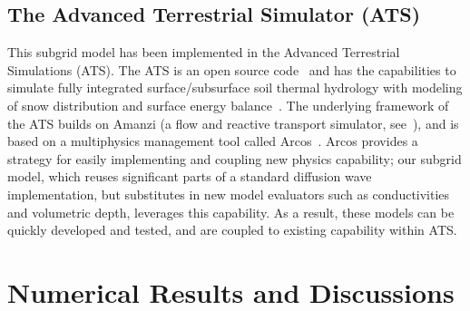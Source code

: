 \documentclass[review,11pt]{elsarticle}
\begin{document}
%
\subsection{The Advanced Terrestrial Simulator (ATS)}\label{ATS}
This subgrid model has been implemented in the Advanced Terrestrial Simulations (ATS).
The ATS is an open source code~\cite{ats-website} and has the capabilities to simulate fully integrated surface/subsurface soil thermal hydrology with modeling of snow distribution and surface energy balance~\cite{spainter2016integrated, atchley2015}.
The underlying framework of the ATS builds on Amanzi (a flow and reactive transport simulator, see~\cite{moulton2012high}), and is based on a multiphysics management tool called Arcos~\cite{ecoon2016managing}.
Arcos provides a strategy for easily implementing and coupling new physics capability; our subgrid model, which reuses significant parts of a standard diffusion wave implementation, but substitutes in new model evaluators such as conductivities and volumetric depth, leverages this capability.
As a result, these models can be quickly developed and tested, and are coupled to existing capability within ATS.


%
\section{Numerical Results and Discussions}\label{numerical-tests}
\FloatBarrier
\end{document}
